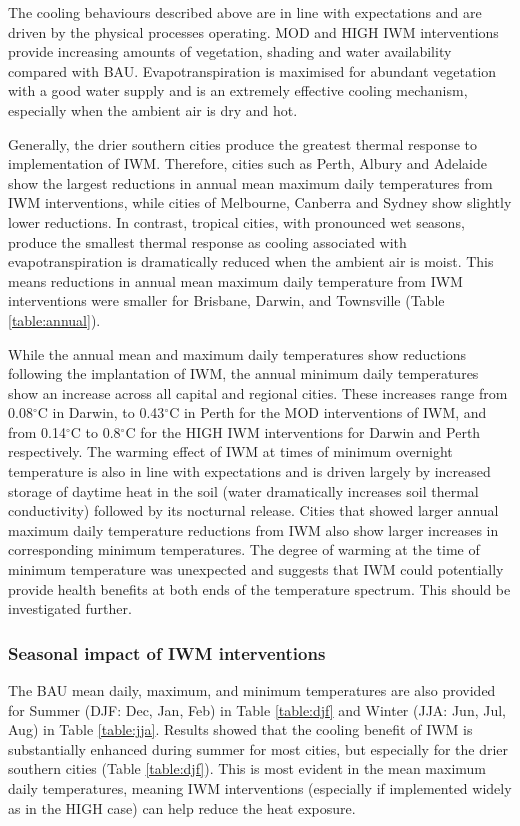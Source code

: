\documentclass[utf8]{frontiersSCNS} %
\begin{document}
The cooling behaviours described above are in line with expectations and are driven by the physical processes operating. MOD and HIGH IWM interventions provide increasing amounts of vegetation, shading and water availability compared with BAU. Evapotranspiration is maximised for abundant vegetation with a good water supply and is an extremely effective cooling mechanism, especially when the ambient air is dry and hot. 

Generally, the drier southern cities produce the greatest thermal response to implementation of IWM. Therefore, cities such as Perth, Albury and Adelaide show the largest reductions in annual mean maximum daily temperatures from IWM interventions, while cities of Melbourne, Canberra and Sydney show slightly lower reductions. In contrast, tropical cities, with pronounced wet seasons, produce the smallest thermal response as cooling associated with evapotranspiration is dramatically reduced when the ambient air is moist. This means reductions in annual mean maximum daily temperature from IWM interventions were smaller for Brisbane, Darwin, and Townsville (Table \ref{table:annual}). 

While the annual mean and maximum daily temperatures show reductions following the implantation of IWM, the annual minimum daily temperatures show an increase across all capital and regional cities. These increases range from 0.08$^{\circ}$C in Darwin, to 0.43$^{\circ}$C in Perth for the MOD interventions of IWM, and from 0.14$^{\circ}$C to 0.8$^{\circ}$C for the HIGH IWM interventions for Darwin and Perth respectively. The warming effect of IWM at times of minimum overnight temperature is also in line with expectations and is driven largely by increased storage of daytime heat in the soil (water dramatically increases soil thermal conductivity) followed by its nocturnal release. Cities that showed larger annual maximum daily temperature reductions from IWM also show larger increases in corresponding minimum temperatures. The degree of warming at the time of minimum temperature was unexpected and suggests that IWM could potentially provide health benefits at both ends of the temperature spectrum. This should be investigated further.

\subsubsection{Seasonal impact of IWM interventions}\label{sec:results2b}

The BAU mean daily, maximum, and minimum temperatures are also provided for Summer (DJF: Dec, Jan, Feb) in Table \ref{table:djf} and Winter (JJA: Jun, Jul, Aug) in Table \ref{table:jja}. Results showed that the cooling benefit of IWM is substantially enhanced during summer for most cities, but especially for the drier southern cities (Table \ref{table:djf}). This is most evident in the mean maximum daily temperatures, meaning IWM interventions (especially if implemented widely as in the HIGH case) can help reduce the heat exposure.
\end{document}
